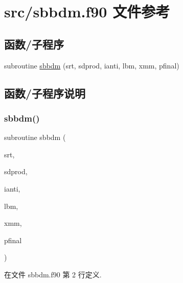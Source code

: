 \hypertarget{sbbdm_8f90}{}\section{src/sbbdm.f90 文件参考}
\label{sbbdm_8f90}
\subsection*{函数/子程序}
\begin{DoxyCompactItemize}
\item 
subroutine \mbox{\hyperlink{sbbdm_8f90_a75b3c8e9abcb89a5eb3c6e35be6f0f33}{sbbdm}} (srt, sdprod, ianti, lbm, xmm, pfinal)
\end{DoxyCompactItemize}


\subsection{函数/子程序说明}
\mbox{\label{sbbdm_8f90_a75b3c8e9abcb89a5eb3c6e35be6f0f33}} 
\subsubsection{\texorpdfstring{sbbdm()}{sbbdm()}}
{\footnotesize\ttfamily subroutine sbbdm (\begin{DoxyParamCaption}\item[{}]{srt,  }\item[{}]{sdprod,  }\item[{}]{ianti,  }\item[{}]{lbm,  }\item[{}]{xmm,  }\item[{}]{pfinal }\end{DoxyParamCaption})}



在文件 sbbdm.\+f90 第 2 行定义.

